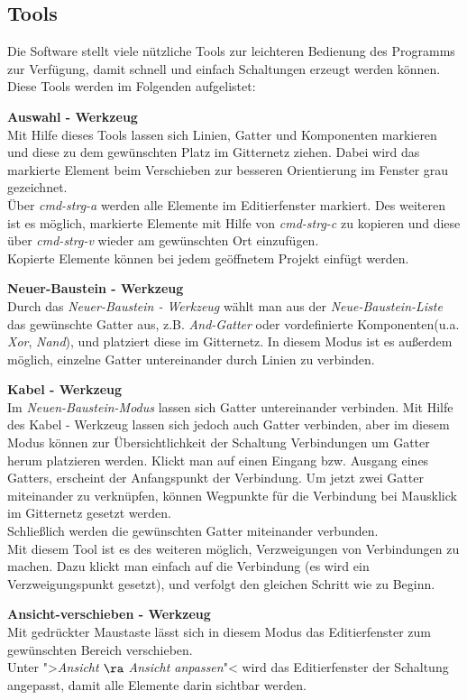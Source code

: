 \documentclass[12pt,a4paper]{scrartcl}
\newcommand{\fckNewBrickList}{Neue-Baustein-Liste\xspace}
\newcommand{\fckNewBrickTool}{Neuer-Baustein - Werkzeug\xspace}
\newcommand{\fckWireTool}{Kabel - Werkzeug\xspace}
\newcommand{\fckSelectTool}{Auswahl - Werkzeug\xspace}
\newcommand{\fckMoveViewportTool}{Ansicht-verschieben - Werkzeug\xspace}
\begin{document}
\subsection{Tools}
Die Software stellt viele nützliche Tools zur leichteren Bedienung des Programms zur Verfügung, damit schnell und einfach Schaltungen erzeugt werden können. Diese Tools werden im Folgenden aufgelistet:
\begin{enum}
	\item \textbf{\fckSelectTool} \\
		Mit Hilfe dieses Tools lassen sich Linien, Gatter und Komponenten markieren und diese zu dem gewünschten Platz im Gitternetz ziehen. Dabei wird das markierte Element beim Verschieben zur besseren Orientierung im Fenster grau gezeichnet. \\
		Über \textit{\gls{cmd-strg-a}} werden alle Elemente im Editierfenster markiert. Des weiteren ist es möglich, markierte Elemente mit Hilfe von \textit{\gls{cmd-strg-c}} zu kopieren und diese über \textit{\gls{cmd-strg-v}} wieder am gewünschten Ort einzufügen. \\
		Kopierte Elemente können bei jedem geöffnetem Projekt einfügt werden.
	\item \textbf{\fckNewBrickTool} \\
		Durch das \textit{\fckNewBrickTool}  wählt man aus der \textit{\fckNewBrickList} das gewünschte Gatter aus, z.B. \textit{And-Gatter} oder vordefinierte Komponenten(u.a. \textit{Xor}, \textit{Nand}), und platziert diese im Gitternetz. In diesem Modus ist es außerdem möglich, einzelne Gatter untereinander durch Linien zu verbinden.
	\item \textbf{\fckWireTool} \\
		Im \textit{Neuen-Baustein-Modus} lassen sich Gatter untereinander verbinden. Mit Hilfe des \fckWireTool lassen sich jedoch auch Gatter verbinden, aber im diesem Modus können zur Übersichtlichkeit der Schaltung Verbindungen um Gatter herum platzieren werden. Klickt man auf einen Eingang bzw. Ausgang eines Gatters, erscheint der Anfangspunkt der Verbindung. Um jetzt zwei Gatter miteinander zu verknüpfen, können Wegpunkte für die Verbindung bei Mausklick im Gitternetz gesetzt werden. \\
		Schließlich werden die gewünschten Gatter miteinander verbunden. \\
		Mit diesem Tool ist es des weiteren möglich, Verzweigungen von Verbindungen zu machen. Dazu klickt man einfach auf die Verbindung (es wird ein Verzweigungspunkt gesetzt), und verfolgt den gleichen Schritt wie zu Beginn.
	\item \textbf{\fckMoveViewportTool} \\
		Mit gedrückter Maustaste lässt sich in diesem Modus das Editierfenster zum gewünschten Bereich verschieben. \\
		Unter ">\textit{Ansicht} $\ra$ \textit{Ansicht anpassen}"< wird das Editierfenster der Schaltung angepasst, damit alle Elemente darin sichtbar werden.
\end{enum}
\end{document}
